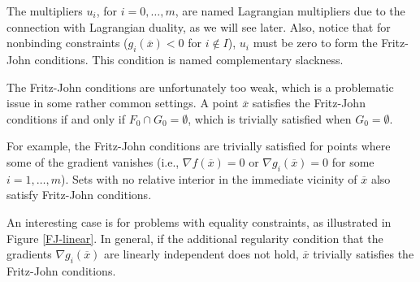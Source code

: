 The multipliers $u_i$, for $i=0,\dots,m$, are named Lagrangian multipliers due to the connection with Lagrangian duality, as we will see later. Also, notice that for nonbinding constraints ($g_i(\overline{x})<0$ for $i \notin I$), $u_i$ must be zero to form the Fritz-John conditions. This condition is named complementary slackness. 


The Fritz-John conditions are unfortunately too weak, which is a problematic issue in some rather common settings. A point $\overline{x}$ satisfies the Fritz-John conditions if and only if $F_0 \cap G_0 = \emptyset$, which is trivially satisfied when $G_0 = \emptyset$.

For example, the Fritz-John conditions are trivially satisfied for points where some of the gradient vanishes (i.e., $\nabla f (\overline{x})=0$ or $\nabla g_i(\overline{x})=0$ for some $i=1,\dots,m$). Sets with no relative interior in the immediate vicinity of $\overline{x}$ also satisfy Fritz-John conditions. 

An interesting case is for problems with equality constraints, as illustrated in Figure \ref{FJ-linear}. In general, if the additional regularity condition that the gradients $\nabla g_i(\overline{x})$ are linearly independent does not hold, $\overline{x}$ trivially satisfies the Fritz-John conditions.

